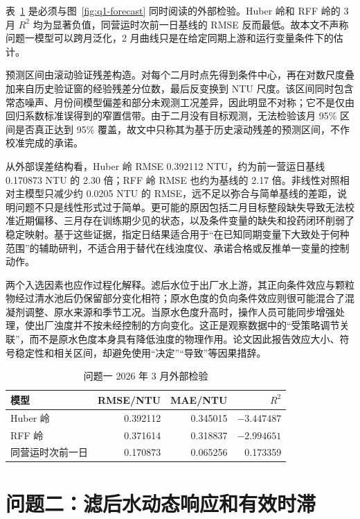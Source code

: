 \documentclass[UTF8,12pt,a4paper]{ctexart}
\newcommand{\Rtwo}{R^{2}}
\begin{document}
表~\ref{tab:q1eval} 是必须与图~\ref{fig:q1-forecast} 同时阅读的外部检验。Huber 岭和 RFF 岭的 3 月 $\Rtwo$ 均为显著负值，同营运时次前一日基线的 RMSE 反而最低。故本文不声称问题一模型可以跨月泛化，2 月曲线只是在给定同期上游和运行变量条件下的估计。

预测区间由滚动验证残差构造。对每个二月时点先得到条件中心，再在对数尺度叠加来自历史验证窗的经验残差分位数，最后反变换到 NTU 尺度。该区间同时包含常态噪声、月份间模型偏差和部分未观测工况差异，因此明显不对称；它不是仅由回归系数标准误得到的窄置信带。由于二月没有目标观测，无法检验该月 95\% 区间是否真正达到 95\% 覆盖，故文中只称其为基于历史滚动残差的预测区间，不作校准完成的承诺。

从外部误差结构看，Huber 岭 RMSE 0.392112 NTU，约为前一营运日基线 0.170873 NTU 的 2.30 倍；RFF 岭 RMSE 也约为基线的 2.17 倍。非线性对照相对主模型只减少约 0.0205 NTU 的 RMSE，远不足以弥合与简单基线的差距，说明问题不只是线性形式过于简单。更可能的原因包括二月目标整段缺失导致无法校准近期偏移、三月存在训练期少见的状态，以及条件变量的缺失和投药闭环削弱了稳定映射。基于这些证据，指定日结果适合用于“在已知同期变量下大致处于何种范围”的辅助研判，不适合用于替代在线浊度仪、承诺合格或反推单一变量的控制动作。

两个入选因素也应作过程化解释。滤后水位于出厂水上游，其正向条件效应与颗粒物经过清水池后仍保留部分变化相符；原水色度的负向条件效应则很可能混合了混凝剂调整、原水来源和季节工况。当原水色度升高时，操作人员可能同步增强处理，使出厂浊度并不按未经控制的方向变化。这正是观察数据中的“受策略调节关联”，而不是原水色度本身具有降低浊度的物理作用。论文因此报告效应大小、符号稳定性和相关区间，却避免使用“决定”“导致”等因果措辞。

\begin{table}[htbp]
\centering
\caption{问题一 2026 年 3 月外部检验}
\label{tab:q1eval}
\begin{tabular}{lrrr}
\toprule
模型 & RMSE/NTU & MAE/NTU & $\Rtwo$\\
\midrule
Huber 岭 & 0.392112 & 0.345015 & $-3.447487$\\
RFF 岭 & 0.371614 & 0.318837 & $-2.994651$\\
同营运时次前一日 & 0.170873 & 0.065256 & 0.173359\\
\bottomrule
\end{tabular}
\end{table}

\section{问题二：滤后水动态响应和有效时滞}
\end{document}
